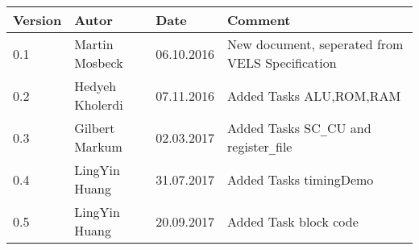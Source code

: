 
\begin{table}[h]
\begin{tabular*}{14.7cm}{|p{}|p{}|p{2cm}|p{}|}
\hline 
Version & Autor & Date & Comment \\[2pt]
\hline
\hline
0.1 & Martin Mosbeck & 06.10.2016& New document, seperated from VELS Specification \\[2pt]
\hline
0.2 & Hedyeh Kholerdi & 07.11.2016& Added Tasks ALU,ROM,RAM \\[2pt]
\hline
0.3 & Gilbert Markum & 02.03.2017 & Added Tasks SC\verb!_!CU and register\verb!_!file \\[2pt]
\hline
0.4 & LingYin Huang & 31.07.2017 & Added Tasks timingDemo \\ [2pt]
\hline
0.5 & LingYin Huang & 20.09.2017 & Added Task block code \\ [2pt]
\hline
\end{tabular*}
\end{table}

